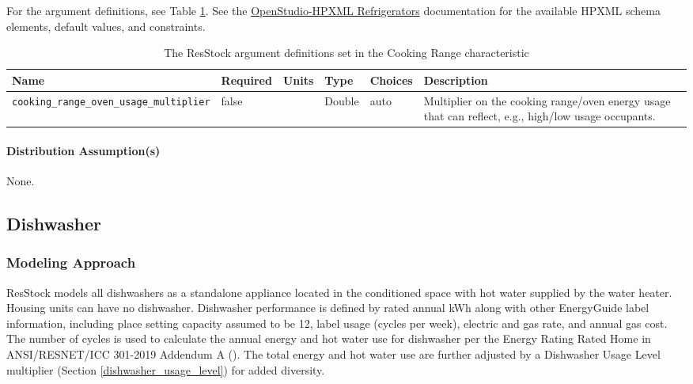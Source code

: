 For the argument definitions, see Table \ref{table:hc_arg_def_cooking_range_usage_level}. See the \href{https://openstudio-hpxml.readthedocs.io/en/v1.8.1/workflow_inputs.html#hpxml-refrigerators}{OpenStudio-HPXML Refrigerators} documentation for the available HPXML schema elements, default values, and constraints.
\begin{longtable}[]{ |p{}|p{1.5cm}|p{1cm}|p{1.1cm}|p{3.4cm}|p{4cm}| }
\caption{The ResStock argument definitions set in the Cooking Range characteristic} \label{table:hc_arg_def_cooking_range_usage_level} \\
\toprule\noalign{}
Name & Required & Units & Type & Choices & Description \\
\midrule\noalign{}
\endhead
\bottomrule\noalign{}
\endlastfoot
\texttt{cooking\_range\_oven\_usage\_multiplier} & false & & Double &
auto & Multiplier on the cooking range/oven energy usage that can
reflect, e.g., high/low usage occupants. \\
\end{longtable}
\paragraph{Distribution Assumption(s)}
None.

\subsection{Dishwasher}
\subsubsection{Modeling Approach}
ResStock models all dishwashers as a standalone appliance located in the conditioned space with hot water supplied by the water heater. Housing units can have no dishwasher. Dishwasher performance is defined by rated annual kWh along with other EnergyGuide label information, including place setting capacity assumed to be 12, label usage (cycles per week), electric and gas rate, and annual gas cost. 
The number of cycles is used to calculate the annual energy and hot water use for dishwasher per the Energy Rating Rated Home in ANSI/RESNET/ICC 301-2019 Addendum A (\cite{ansi_resnet_301_2019}). The total energy and hot water use are further adjusted by a Dishwasher Usage Level multiplier (Section \ref{dishwasher_usage_level}) for added diversity. 

